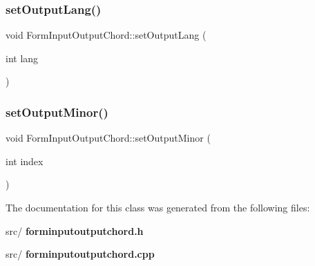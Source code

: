 \mbox{\label{class_form_input_output_chord_aaaba7c9ed645c6aba04da35edabb7328}} 
\subsubsection{set\+Output\+Lang()}
{\footnotesize\ttfamily void Form\+Input\+Output\+Chord\+::set\+Output\+Lang (\begin{DoxyParamCaption}\item[{int}]{lang }\end{DoxyParamCaption})}

\mbox{\label{class_form_input_output_chord_a619ca1b743953dd4b772807e1ab99f1c}} 
\subsubsection{set\+Output\+Minor()}
{\footnotesize\ttfamily void Form\+Input\+Output\+Chord\+::set\+Output\+Minor (\begin{DoxyParamCaption}\item[{int}]{index }\end{DoxyParamCaption})}



The documentation for this class was generated from the following files\+:\begin{DoxyCompactItemize}
\item 
src/\textbf{ forminputoutputchord.\+h}\item 
src/\textbf{ forminputoutputchord.\+cpp}\end{DoxyCompactItemize}
